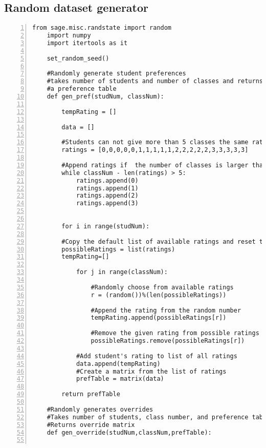 \documentclass[11pt]{article}
\begin{document}
\subsection{Random dataset generator}
\begin{lstlisting}[numbers=left,numberstyle=\tiny,numbersep=0pt]
    from sage.misc.randstate import random
    import numpy
    import itertools as it
	
    set_random_seed()
	
    #Randomly generate student preferences
    #takes number of students and number of classes and returns
    #a preference table
    def gen_pref(studNum, classNum):
    
        tempRating = []

        data = []
    
        #Students can not give more than 5 classes the same rating
        ratings = [0,0,0,0,0,1,1,1,1,1,2,2,2,2,2,3,3,3,3,3]
    
        #Append ratings if  the number of classes is larger than 20
        while classNum - len(ratings) > 5:
            ratings.append(0)
            ratings.append(1)
            ratings.append(2)
            ratings.append(3)
        
        
        for i in range(studNum):
        
        #Copy the default list of available ratings and reset tempRating
        possibleRatings = list(ratings)
        tempRating=[]
        
            for j in range(classNum):
			
                #Randomly choose from available ratings
                r = (random())%(len(possibleRatings))
            
                #Append the rating from the random number
                tempRating.append(possibleRatings[r])
            
                #Remove the given rating from possible ratings
                possibleRatings.remove(possibleRatings[r])

            #Add student's rating to list of all ratings
            data.append(tempRating)
            #Create a matrix from the list of ratings    
            prefTable = matrix(data)

        return prefTable
        
    #Randomly generates overrides
    #Takes number of students, class number, and preference table as parameters
    #Returns override matrix
    def gen_override(studNum,classNum,prefTable):
    

\end{lstlisting}
\end{document}
